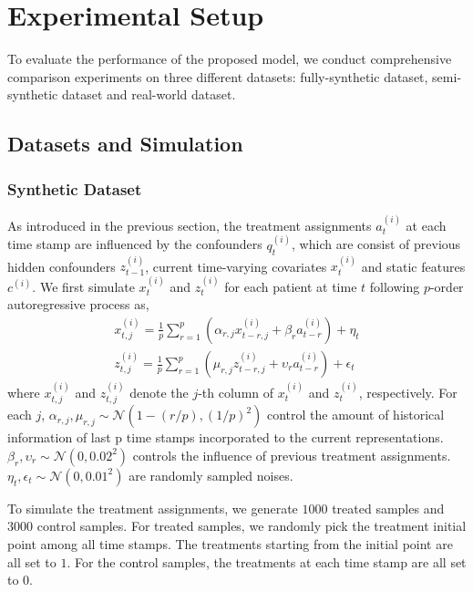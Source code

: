 \vspace{-5pt}
\section{Experimental Setup}
To evaluate the performance of the proposed model, we conduct comprehensive comparison experiments on three different datasets: fully-synthetic dataset, semi-synthetic dataset and real-world dataset.

\subsection{Datasets and Simulation}
\subsubsection{Synthetic Dataset}
As introduced in the previous section, the treatment assignments $a^{(i)}_t$ at each time stamp are influenced by the confounders $q^{(i)}_t$, which are consist of previous hidden confounders $z^{(i)}_{t-1}$, current time-varying covariates $x^{(i)}_t$ and static features $c^{(i)}$. We first simulate $x^{(i)}_t$ and $z^{(i)}_{t}$ for each patient at time $t$ following $p$-order autoregressive process \cite{mills1991time} as,
\begin{equation}
\begin{aligned}
    x^{(i)}_{t,j} = \frac{1}{p}\sum_{r=1}^{p}(\alpha_{r,j}x^{(i)}_{t-r,j}+\beta_{r}a^{(i)}_{t-r}) + \eta_{t}\\
    z^{(i)}_{t,j} = \frac{1}{p}\sum_{r=1}^{p}(\mu_{r,j}z^{(i)}_{t-r,j}+\upsilon_{r}a^{(i)}_{t-r}) + \epsilon_{t}
\end{aligned}
\end{equation}
where $x^{(i)}_{t,j}$ and $z^{(i)}_{t,j}$ denote the $j$-th column of $x^{(i)}_t$ and $z^{(i)}_{t}$, respectively. For each $j$, $\alpha_{r,j},\mu_{r,j}\sim \mathcal{N}(1-(r/p),(1/p)^{2})$ control the amount of historical information of last p time stamps incorporated to the current representations. $\beta_{r},\upsilon_{r}\sim \mathcal{N}(0, 0.02^{2})$ controls the influence of previous treatment assignments. $\eta_{t},\epsilon_{t}\sim \mathcal{N}(0,0.01^{2})$ are randomly sampled noises. 

To simulate the treatment assignments, we generate $1000$ treated samples and $3000$ control samples. For treated samples, we randomly pick the treatment initial point among all time stamps. The treatments starting from the initial point are all set to $1$. For the control samples, the treatments at each time stamp are all set to $0$. 

